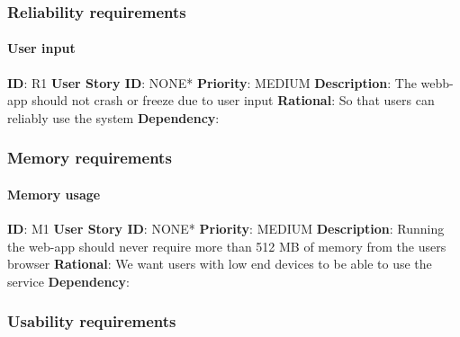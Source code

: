 \documentclass{article}
\begin{document}
\subsubsection{Reliability requirements}

\paragraph{User input}\label{req:}
\textbf{ID}: R1\newline
\textbf{User Story ID}: NONE* \newline
\textbf{Priority}: MEDIUM\newline
\textbf{Description}: The webb-app should not crash or freeze due to user input\newline
\textbf{Rational}: So that users can reliably use the system\newline
\textbf{Dependency}: \newline

\subsubsection{Memory requirements}

\paragraph{Memory usage}\label{req:}
\textbf{ID}: M1 \newline
\textbf{User Story ID}: NONE*\newline
\textbf{Priority}: MEDIUM\newline
\textbf{Description}: Running the web-app should never require more than 512 MB of memory from the users browser\newline
\textbf{Rational}: We want users with low end devices to be able to use the service\newline
\textbf{Dependency}: \newline

\subsubsection{Usability requirements}
\end{document}
